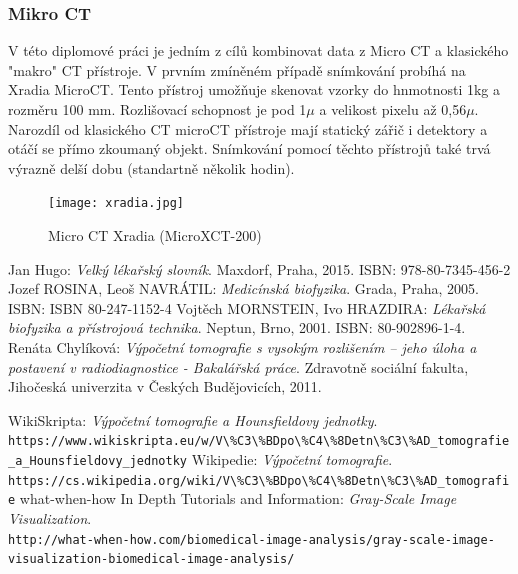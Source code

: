\documentclass{thesis}%
\begin{document}
\subsubsection{Mikro CT}
V této diplomové práci je jedním z cílů kombinovat data z Micro CT a klasického "makro" CT přístroje. V prvním zmíněném případě snímkování probíhá na Xradia MicroCT. Tento přístroj umožňuje skenovat vzorky do hnmotnosti 1kg a rozměru 100 mm. Rozlišovací schopnost je pod 1$\mu$  a velikost pixelu až 0,56$\mu$. Narozdíl od klasického CT microCT přístroje mají statický zářič i detektory a otáčí se přímo zkoumaný objekt. Snímkování pomocí těchto přístrojů také trvá výrazně delší dobu (standartně několik hodin).
\begin{figure}[ht!]
 \centering
	\texttt{[image: xradia.jpg]}
	\caption[Micro CT Xradia]{Micro CT Xradia (MicroXCT-200) }
\end{figure}

\newpage
\listoffigures
\listoftables

\begin{thebibliography}{DUSO}
   Jan Hugo:
    \emph{Velký lékařský slovník}. Maxdorf, Praha, 2015. ISBN: 978-80-7345-456-2 
   Jozef ROSINA, Leoš NAVRÁTIL:
    \emph{Medicínská biofyzika}. Grada, Praha, 2005. ISBN: ISBN 80-247-1152-4
  Vojtěch MORNSTEIN, Ivo HRAZDIRA:
    \emph{Lékařská biofyzika a přístrojová technika}. Neptun, Brno, 2001. ISBN: 80-902896-1-4.
  Renáta Chylíková:
    \emph{Výpočetní tomografie s vysokým rozlišením – jeho úloha a postavení v radiodiagnostice - Bakalářská práce}. Zdravotně sociální fakulta, Jihočeská univerzita v Českých Budějovicích, 2011.



    WikiSkripta:
    \emph{Výpočetní tomografie a Hounsfieldovy jednotky}. \\
    \verb|https://www.wikiskripta.eu/w/V\%C3\%BDpo\%C4\%8Detn\%C3\%AD_tomografie_a_Hounsfieldovy_jednotky|
  Wikipedie:
    \emph{Výpočetní tomografie}. \\
    \verb|https://cs.wikipedia.org/wiki/V\%C3\%BDpo\%C4\%8Detn\%C3\%AD_tomografie|
  what-when-how In Depth Tutorials and Information:
    \emph{Gray-Scale Image Visualization}. \\
    \verb|http://what-when-how.com/biomedical-image-analysis/gray-scale-image-visualization-biomedical-image-analysis/|

\end{thebibliography}
  
%
\end{document}
